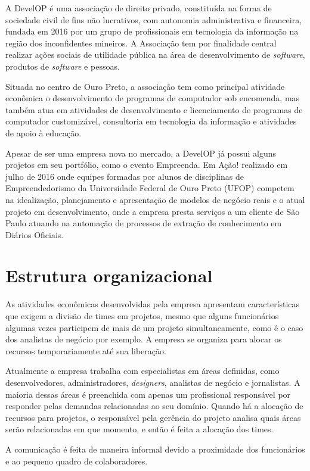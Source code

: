 \documentclass[
	12pt,				%
	openright,			%
	oneside,			%
	a4paper,			%
	english,			%
	french,				%
	spanish,			%
	brazil,				%
	]{abntex2}
\begin{document}
A DevelOP é uma associação de direito privado, constituída na forma de sociedade civil de fins não lucrativos, com autonomia administrativa e financeira, fundada em 2016 por um grupo de profissionais em tecnologia da informação na região dos inconfidentes mineiros. A Associação tem por finalidade central realizar ações sociais de utilidade pública na área de desenvolvimento de \textit{software}, produtos de \textit{software} e pessoas.

Situada no centro de Ouro Preto, a associação tem como principal atividade econômica o desenvolvimento de programas de computador sob encomenda, mas também atua em atividades de desenvolvimento e licenciamento de programas de computador customizável, consultoria em tecnologia da informação e atividades de apoio à educação.

Apesar de ser uma empresa nova no mercado, a DevelOP já possui alguns projetos em seu portfólio, como o evento Empreenda. Em Ação! realizado em julho de 2016 onde equipes formadas por alunos de disciplinas de Empreendedorismo da Universidade Federal de Ouro Preto (UFOP) competem na idealização, planejamento e apresentação de modelos de negócio reais e o atual projeto em desenvolvimento, onde a empresa presta serviços a um cliente de São Paulo atuando na automação de processos de extração de conhecimento em Diários Oficiais.

\section{Estrutura organizacional}

As atividades econômicas desenvolvidas pela empresa apresentam características que exigem a divisão de times em projetos, mesmo que alguns funcionários algumas vezes participem de mais de um projeto simultaneamente, como é o caso dos analistas de negócio por exemplo. A empresa se organiza para alocar os recursos temporariamente até sua liberação.

Atualmente a empresa trabalha com especialistas em áreas definidas, como desenvolvedores, administradores, \textit{designers}, analistas de negócio e jornalistas. A maioria dessas áreas é preenchida com apenas um profissional responsável por responder pelas demandas relacionadas ao seu domínio. Quando há a alocação de recursos para projetos, o responsável pela gerência do projeto analisa quais áreas serão relacionadas em que momento, e então é feita a alocação dos times.

A comunicação é feita de maneira informal devido a proximidade dos funcionários e ao pequeno quadro de colaboradores.
\end{document}
